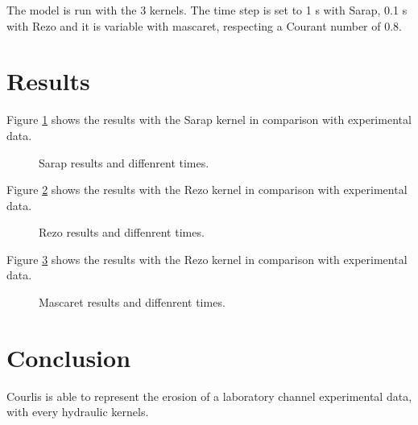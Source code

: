The model is run with the 3 kernels. The time step is set to 1 s with 
Sarap, 0.1 s with Rezo and it is variable with mascaret, respecting 
a Courant number of 0.8.

\section{Results}

Figure \ref{newton:fig:sarap} shows the results with the Sarap kernel
in comparison with experimental data.

\begin{figure}[h]
 \centering
 \caption{Sarap results and diffenrent times.}
 \label{newton:fig:sarap}
\end{figure}

Figure \ref{newton:fig:rezo} shows the results with the Rezo kernel
in comparison with experimental data.

\begin{figure}[h]
 \centering
 \caption{Rezo results and diffenrent times.}
 \label{newton:fig:rezo}
\end{figure}

Figure \ref{newton:fig:mascaret} shows the results with the Rezo kernel
in comparison with experimental data.

\begin{figure}[h]
 \centering
 \caption{Mascaret results and diffenrent times.}
 \label{newton:fig:mascaret}
\end{figure}

\section{Conclusion}

Courlis is able to represent the erosion of a laboratory channel 
experimental data, with every hydraulic kernels.
